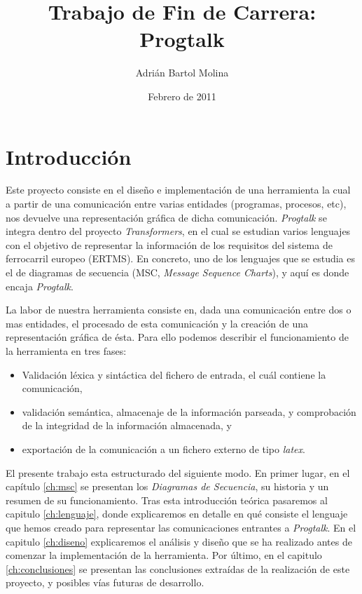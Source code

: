 \documentclass[12pt,a4paper]{report}
\title{Trabajo de Fin de Carrera: Progtalk}
\author{Adrián Bartol Molina}
\date{Febrero de 2011}
\begin{document}
\maketitle
\tableofcontents

\chapter*{Introducción}

Este proyecto consiste en el diseño e implementación de una herramienta la cual a partir de una comunicación entre varias entidades (programas, procesos, etc), nos devuelve una representación gráfica de dicha comunicación. \textit{Progtalk} se integra dentro del proyecto \textit{Transformers}, en el cual se estudian varios lenguajes con el objetivo de representar la información de los requisitos del sistema de ferrocarril europeo (ERTMS). En concreto, uno de los lenguajes que se estudia es el de diagramas de secuencia (MSC, \emph{Message Sequence Charts}), y aquí es donde encaja \textit{Progtalk}. 

La labor de nuestra herramienta consiste en, dada una comunicación entre dos o mas entidades, el procesado de esta comunicación y la creación de una representación gráfica de ésta. Para ello podemos describir el funcionamiento de la herramienta en tres fases:

\begin{itemize}
\item Validación léxica y sintáctica del fichero de entrada, el cuál contiene la comunicación,
\item validación semántica, almacenaje de la información parseada, y comprobación de la integridad de la información almacenada, y
\item exportación de la comunicación a un fichero externo de tipo \textit{latex}.
\end{itemize}

El presente trabajo esta estructurado del siguiente modo. En primer lugar, en el capítulo \ref{ch:msc} se presentan los \textit{Diagramas de Secuencia}, su historia y un resumen de su funcionamiento. Tras esta introducción teórica pasaremos al capitulo \ref{ch:lenguaje}, donde explicaremos en detalle en qué consiste el lenguaje que hemos creado para representar las comunicaciones entrantes a \textit{Progtalk}. En el capitulo \ref{ch:diseno} explicaremos el análisis y diseño que se ha realizado antes de comenzar la implementación de la herramienta. Por último, en el capitulo \ref{ch:conclusiones} se presentan las conclusiones extraídas de la realización de este proyecto, y posibles vías futuras de desarrollo.
\end{document}
